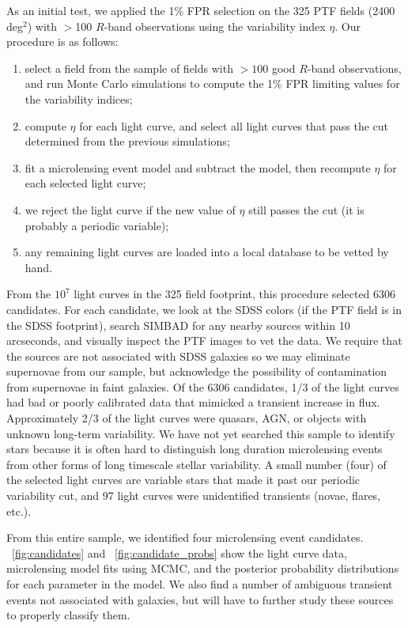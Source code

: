 \documentclass{emulateapj}
\newcommand{\apwsim}{\raisebox{0.2ex}{\scriptsize$\sim$\normalsize}}
\begin{document}
As an initial test, we applied the 1\% FPR selection on the 325 PTF fields (\apwsim2400 deg$^2$) with $>$100 $R$-band observations using the variability index $\eta$. Our procedure is as follows:
\begin{enumerate}
	\item select a field from the sample of fields with $>100$ good $R$-band observations, and run Monte Carlo simulations to compute the 1\% FPR limiting values for the variability indices;
	\item compute $\eta$ for each light curve, and select all light curves that pass the cut determined from the previous simulations;
	\item fit a microlensing event model and subtract the model, then recompute $\eta$ for each selected light curve;
	\item we reject the light curve if the new value of $\eta$ still passes the cut (it is probably a periodic variable);
	\item any remaining light curves are loaded into a local database to be vetted by hand.
\end{enumerate}

From the \apwsim$10^7$ light curves in the 325 field footprint, this procedure selected 6306 candidates. For each candidate, we look at the SDSS colors (if the PTF field is in the SDSS footprint), search SIMBAD for any nearby sources within 10 arcseconds, and visually inspect the PTF images to vet the data. We require that the sources are not associated with SDSS galaxies so we may eliminate supernovae from our sample, but acknowledge the possibility of contamination from supernovae in faint galaxies. Of the 6306 candidates, \apwsim1/3 of the light curves had bad or poorly calibrated data that mimicked a transient increase in flux. Approximately 2/3 of the light curves were quasars, AGN, or objects with unknown long-term variability. We have not yet searched this sample to identify stars because it is often hard to distinguish long duration microlensing events from other forms of long timescale stellar variability. A small number (four) of the selected light curves are variable stars that made it past our periodic variability cut, and 97 light curves were unidentified transients (novae, flares, etc.). 

From this entire sample, we identified four microlensing event candidates. \figurename~\ref{fig:candidates} and \figurename~\ref{fig:candidate_probs} show the light curve data, microlensing model fits using MCMC, and the posterior probability distributions for each parameter in the model. We also find a number of ambiguous transient events not associated with galaxies, but will have to further study these sources to properly classify them.
\end{document}
